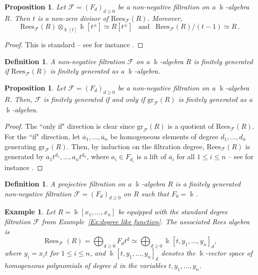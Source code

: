 \documentclass[12pt,letterpaper, reqno]{amsart}
\newtheorem{proposition}[theorem]{Proposition}
\theoremstyle{defstyle} \newtheorem{definition}[theorem]{Definition}
\newtheorem{example}[theorem]{Example}
\theoremstyle{remark}
\numberwithin{equation}{section}
\numberwithin{figure}{section}
\newcommand{\cF} {\mathcal{F}}
\newcommand{\gr} {\mathrm{gr}}
\newcommand{\kk} {\Bbbk}
\begin{document}
\begin{proposition}
 Let $\cF=(F_d)_{d \geq 0}$ be a non-negative filtration on a $\kk$-algebra $R$. Then $t$ is a non-zero divisor of  $\mathrm{Rees}_\cF(R)$. Moreover, 
 \[  \mathrm{Rees}_\cF(R)  \otimes_{\kk[t]} \kk[t^\pm] \simeq R[t^\pm]\,\,\,\,\,\text{and}\,\,\,\,\,  \mathrm{Rees}_\cF(R)/(t-1) \simeq R \,. \]
\end{proposition}

\begin{proof}
This is standard -- see for instance \cite[I.9.5 (i)]{MR1321145}.
\end{proof}


\begin{definition}
A non-negative filtration $\cF$ on a $\kk$-algebra $R$ is \emph{finitely generated} if $\mathrm{Rees}_\cF(R)$ is finitely generated as a $\kk$-algebra.
\end{definition}


\begin{proposition} \label{prop_finitely_generated}
Let $\cF=(F_d)_{d \geq 0}$ be a non-negative filtration on a $\kk$-algebra $R$. Then, $\cF$ is finitely generated if and only if $\gr_\cF(R)$ is finitely generated as a $\kk$-algebra.
\end{proposition}

\begin{proof}
The ``only if" direction is clear since $\gr_\cF(R)$ is a quotient of $\mathrm{Rees}_\cF(R)$.
For the ``if" direction, let  $\overline{a}_1,\dots,\overline{a}_n$ be homogeneous elements of degree $d_1, \dots, d_n$ generating $\gr_\cF(R)$. Then, by induction on the filtration degree,  $\mathrm{Rees}_\cF(R)$ is generated by $a_1 t^{d_1}, \dots, a_n t^{d_n}$, where $a_i \in F_{d_i}$ is a lift of $\overline{a}_i$ for all $1 \leq i \leq n$ -- see for instance
\cite[I.9.5 (ii)]{MR1321145}.
\end{proof}

\begin{definition}
A \emph{projective} filtration on a $\kk$-algebra $R$ is a finitely generated non-negative filtration $\cF=(F_d)_{d\geq 0}$ on $R$ such that $F_0=\kk$.
\end{definition}

\begin{example}
Let \(R=\kk[x_1,\dots,x_n]\) be equipped with the standard degree filtration \(\mathcal{F}\) from Example~\ref{Ex:degree like function}. The associated Rees algebra is
\[
\operatorname{Rees}_{\mathcal{F}}(R)
=\bigoplus_{d\geq 0}F_dt^d
\simeq
\bigoplus_{d\geq 0}\kk[t,y_1,\dots,y_n]_d,
\]
where \(y_i=x_it\) for \(1\le i\le n\), and \(\kk[t,y_1,\dots,y_n]_d\) denotes the \(\kk\)-vector space of homogeneous polynomials of degree \(d\) in the variables \(t,y_1,\dots,y_n\).
\end{example}
\end{document}
